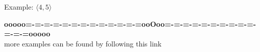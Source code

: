 \documentclass{ximera}
\begin{document}
Example:  $\langle 4, 5 \rangle$












\begin{center}
\textbf{\textcolor{green!50!black}{ooooo=-=-=-=-=-=-=-=-=-=-=-=-=ooOoo=-=-=-=-=-=-=-=-=-=-=-=-=ooooo}} \\

more examples can be found by following this link\\ 

\end{center}
\end{document}

